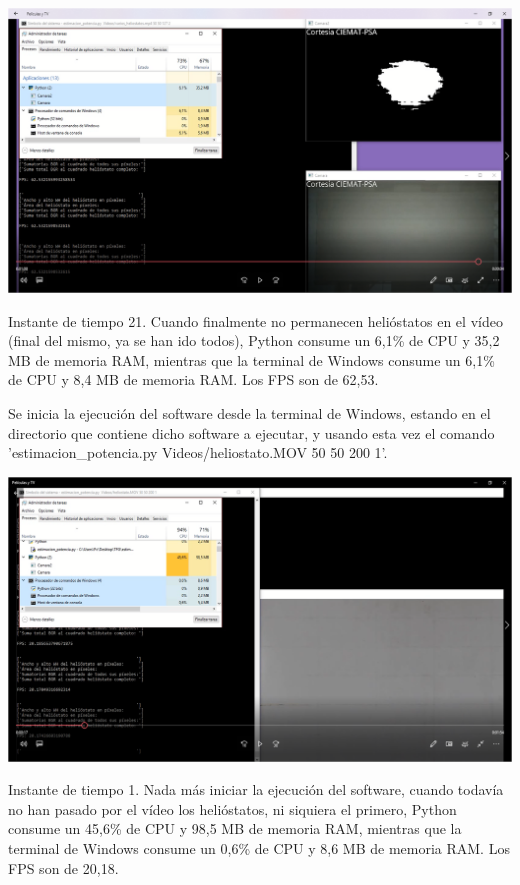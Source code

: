 \documentclass[12pt]{article}
\begin{document}
\includegraphics[width=\textwidth]{CapturasRendimientoSoftware1/Imagen21.png}

Instante de tiempo 21. Cuando finalmente no permanecen helióstatos en el vídeo (final del mismo, ya se han ido todos), Python consume un 6,1\% de CPU y 35,2 MB de memoria RAM, mientras que la terminal de Windows consume un 6,1\% de CPU y 8,4 MB de memoria RAM. Los FPS son de 62,53.



Se inicia la ejecución del software desde la terminal de Windows, estando en el directorio que contiene dicho software a ejecutar, y usando esta vez el comando 'estimacion\_potencia.py Videos/heliostato.MOV 50 50 200 1'.

\includegraphics[width=\textwidth]{CapturasRendimientoSoftware2/Imagen1.png}

Instante de tiempo 1. Nada más iniciar la ejecución del software, cuando todavía no han pasado por el vídeo los helióstatos, ni siquiera el primero, Python consume un 45,6\% de CPU y 98,5 MB de memoria RAM, mientras que la terminal de Windows consume un 0,6\% de CPU y 8,6 MB de memoria RAM. Los FPS son de 20,18.
\end{document}
